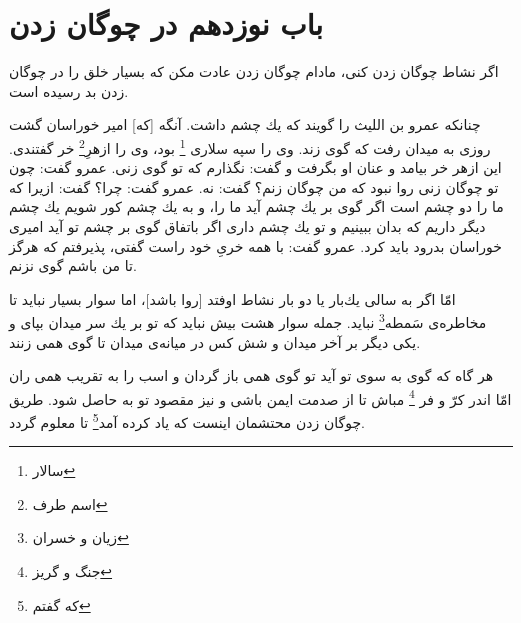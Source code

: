 \section*{باب نوزدهم
در چوگان زدن}

اگر نشاط چوگان زدن كنى، مادام چوگان زدن عادت مكن كه بسيار خلق را در چوگان زدن بد رسيده است.

 چنانكه عمرو بن الليث را گويند كه يك چشم داشت. آنگه [كه] امير خوراسان گشت روزى به ميدان رفت كه گوى زند. وى را سپه سلارى \footnote{ سالار} بود، وى را ازهرِ\footnote{اسم طرف} خر گفتندى. اين ازهر خر بيامد و عنان او بگرفت و گفت: نگذارم كه تو گوى زنى. عمرو گفت: چون تو چوگان زنى روا نبود كه من چوگان زنم‌؟ گفت: نه. عمرو گفت: چرا؟ گفت: ازيرا كه ما را دو چشم است اگر گوى بر يك چشم آيد ما را، و به يك چشم كور شويم يك چشم ديگر داريم كه بدان ببينيم و تو يك چشم دارى اگر باتفاق گوى بر چشم تو آيد اميرى خوراسان بدرود بايد كرد. عمرو گفت: با همه خرىِ خود راست گفتى، پذيرفتم كه هرگز تا من باشم گوى نزنم.

امّا اگر به سالى يك‌بار يا دو بار نشاط اوفتد [روا باشد]، اما سوار بسيار نبايد تا مخاطره‌ی سَمطه\footnote{زیان و خسران} نبايد. جمله سوار هشت بيش نبايد كه تو بر يك سر ميدان بپاى و يكى ديگر بر آخر ميدان و شش كس در ميانه‌ی ميدان تا گوى همى زنند.

هر گاه كه گوى به سوى تو آيد تو گوى همى باز گردان و اسب را به تقريب همى ران امّا اندر كرّ و فر  \footnote{جنگ و گریز} مباش تا از صدمت ايمن باشى و نيز مقصود تو به حاصل شود. طريق چوگان زدن محتشمان اينست كه ياد كرده آمد\footnote{که گفتم} تا معلوم گردد.




















\newpage
